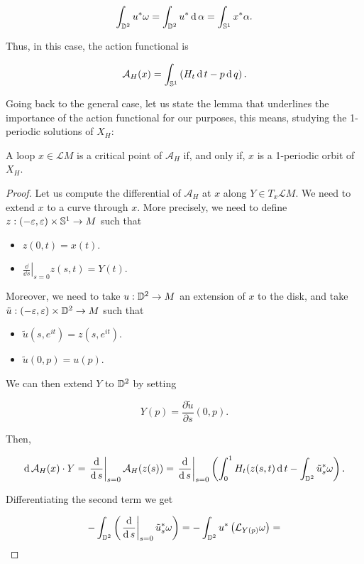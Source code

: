 $$\int_{\mathbb{D}^2} u^{\ast} \omega = \int_{\mathbb{D}^2}  u^{\ast} \operatorname d \alpha = \int_{\mathbb{S}^1} x^{\ast} \alpha .$$

Thus, in this case, the action functional is

$$\mathcal{A}_H (x) = \int_{\mathbb{S}^1} \left( H_t \operatorname d t - p \operatorname d q \right) .$$

Going back to the general case, let us state the lemma that underlines the importance of the action functional for our purposes, this means, studying the 1-periodic solutions of $X_H$:

\begin{prop}
A loop $x \in \mathcal{L}M$ is a critical point of $\mathcal{A}_H$ if, and only if, $x$ is a 1-periodic orbit of $X_H$.
\end{prop}

\begin{proof}
Let us compute the differential of $\mathcal{A}_H$ at $x$ along $Y \in T_x\mathcal{L}M$. We need to extend $x$ to a curve through $x$. More precisely, we need to define $z : (-\varepsilon,\varepsilon) \times \mathbb{S}^1 \rightarrow M$ such that

\begin{itemize}
	\item $z(0,t) = x(t)$.
	\item $\left. \frac{\dd}{\dd s} \right|_{s=0} z(s,t) = Y(t)$.
\end{itemize}

Moreover, we need to take $u : \mathbb{D}^2 \rightarrow M$ an extension of $x$ to the disk, and take $\tilde{u} : (-\varepsilon,\varepsilon) \times \mathbb{D}^2 \rightarrow M$ such that

\begin{itemize}
	\item $\tilde{u}(s,e^{it}) = z(s,e^{it})$.
	\item $\tilde{u}(0,p) = u(p)$.
\end{itemize}

We can then extend $Y$ to $\mathbb{D}^2$ by setting

$$Y(p) = \frac{\partial \tilde{u}}{\partial s} (0,p) .$$

Then,

$$\operatorname d \mathcal{A}_H(x) \cdot Y = \left. \frac{\operatorname d}{\operatorname d s} \right|_{s=0} \mathcal{A}_H(z(s)) = \left. \frac{\operatorname d}{\operatorname d s} \right|_{s=0} \left( \int_0^1 H_t(z(s,t) \operatorname d t - \int_{\mathbb{D}^2} \tilde{u}_s^{\ast} \omega \right) .$$

Differentiating the second term we get

$$- \int_{\mathbb{D}^2} \left( \left. \frac{\operatorname d}{\operatorname d s} \right|_{s=0} \tilde{u}_s^{\ast} \omega \right) = - \int_{\mathbb{D}^2} u^{\ast} \left( \mathcal{L}_{Y(p)} \omega \right) =$$


\end{proof}

